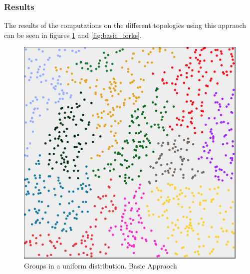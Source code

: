 \subsubsection{Results}
The results of the computations on the different topologies using this appraoch can be seen in figures \ref{fig:basic_uniform} and  \ref{fig:basic_forks}.
 
\begin{figure}
	\center
	\includegraphics[scale=0.46]{Images/computations/BASIC500x500_1000n.jpg}
	\caption{Groups in a uniform distribution. Basic Appraoch}
	\label{fig:basic_uniform}
\end{figure}

